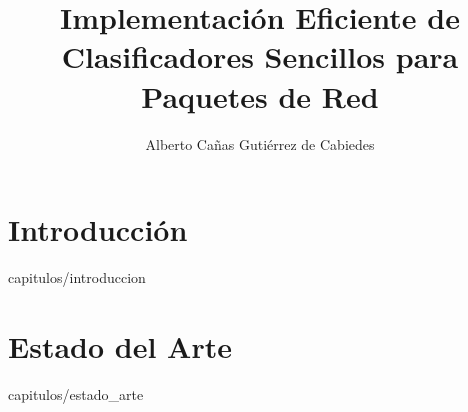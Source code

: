 \documentclass[final, epsbased]{tfgtfmthesisuam}
\title{Implementación Eficiente de Clasificadores Sencillos para Paquetes de Red}
\author{Alberto Cañas Gutiérrez de Cabiedes}
\begin{document}
\chapter{Introducción}{capitulos/introduccion}
\chapter{Estado del Arte}{capitulos/estado_arte}

\printglossary


\end{document}
